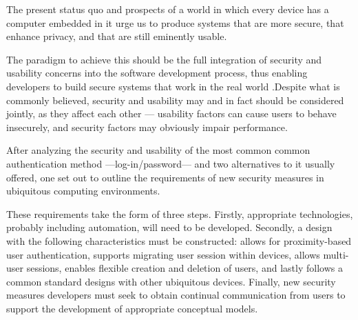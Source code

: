 \documentclass{article}
\begin{document}
The present status quo and prospects of a world in which every device has a computer embedded in it urge us to produce systems that are more secure, that enhance privacy, and that are still eminently usable. 

The paradigm to achieve this should be the full integration of security and usability concerns into the software development process, thus enabling developers to build secure systems that work in the real world \cite{flechais2003bringing}.Despite what is commonly believed, security and usability may and in fact should be considered jointly, as they affect each other --- usability factors can cause users to behave insecurely, and security factors may obviously impair performance.

After analyzing the security and usability of the most common common authentication method ---log-in/password--- and two alternatives to it usually offered, one set out to outline the requirements of new security measures in ubiquitous computing environments.

These requirements take the form of three steps. Firstly, appropriate technologies, probably including automation, will need to be developed. Secondly, a design with the following characteristics must be constructed: allows for proximity-based user authentication, supports migrating user session within devices, allows multi-user sessions, enables flexible creation and deletion of users, and lastly follows a common standard designs with other ubiquitous devices. Finally, new security measures developers must seek to obtain continual communication from users to support the development of appropriate conceptual models.



\end{document}
